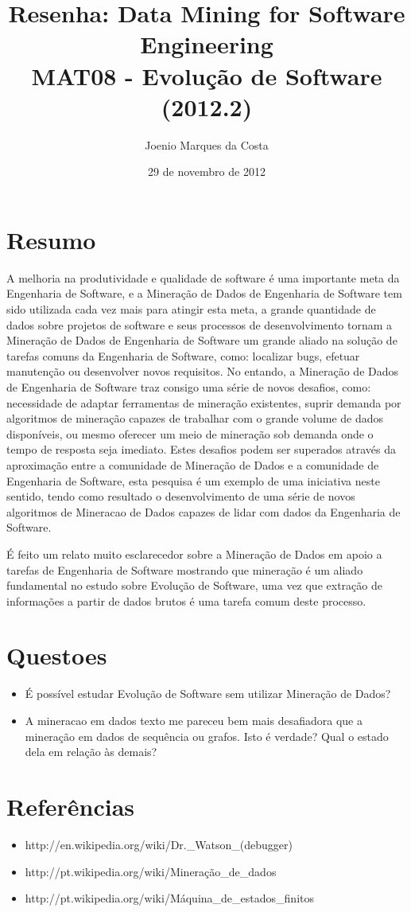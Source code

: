 \documentclass[12pt]{article}
\title{Resenha: Data Mining for Software Engineering \\
 \large MAT08 - Evolução de Software (2012.2)}
\author{Joenio Marques da Costa}
\date{29 de novembro de 2012}
\begin{document}
\maketitle

\section{Resumo}

A melhoria na produtividade e qualidade de software é uma importante meta da
Engenharia de Software, e a Mineração de Dados de Engenharia de Software tem
sido utilizada cada vez mais para atingir esta meta, a grande quantidade de
dados sobre projetos de software e seus processos de desenvolvimento tornam a
Mineração de Dados de Engenharia de Software um grande aliado na solução de
tarefas comuns da Engenharia de Software, como: localizar bugs, efetuar
manutenção ou desenvolver novos requisitos. No entando, a Mineração de Dados de
Engenharia de Software traz consigo uma série de novos desafios, como:
necessidade de adaptar ferramentas de mineração existentes, suprir demanda por
algoritmos de mineração capazes de trabalhar com o grande volume de dados
disponíveis, ou mesmo oferecer um meio de mineração sob demanda onde o tempo de
resposta seja imediato. Estes desafios podem ser superados através da
aproximação entre a comunidade de Mineração de Dados e a comunidade de
Engenharia de Software, esta pesquisa é um exemplo de uma iniciativa neste
sentido, tendo como resultado o desenvolvimento de uma série de novos
algoritmos de Mineracao de Dados capazes de lidar com dados da Engenharia de
Software.

É feito um relato muito esclarecedor sobre a Mineração de Dados em apoio a
tarefas de Engenharia de Software mostrando que mineração é um aliado
fundamental no estudo sobre Evolução de Software, uma vez que extração de
informações a partir de dados brutos é uma tarefa comum deste processo.

\section{Questoes}

\begin{itemize}
  \item É possível estudar Evolução de Software sem utilizar Mineração de
     Dados?
  \item A mineracao em dados texto me pareceu bem mais desafiadora que a
     mineração em dados de sequência ou grafos. Isto é verdade? Qual o estado
     dela em relação às demais?
\end{itemize}

\section{Referências}

\begin{itemize}
  \item http://en.wikipedia.org/wiki/Dr.\_Watson\_(debugger)
  \item http://pt.wikipedia.org/wiki/Mineração\_de\_dados
  \item http://pt.wikipedia.org/wiki/Máquina\_de\_estados\_finitos
\end{itemize}
\end{document}
